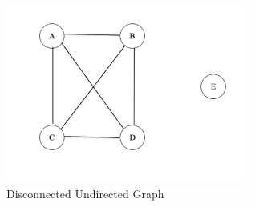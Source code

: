 \documentclass{article}
\begin{document}
\begin{enumerate}[label=(\alph*)]
\begin{figure}[htp]
    \centering
    \includegraphics[width=8cm]{partc.png}
    \caption{Disconnected Undirected Graph}
    \label{fig:tree}
\end{figure}


\end{enumerate}
\end{document}
